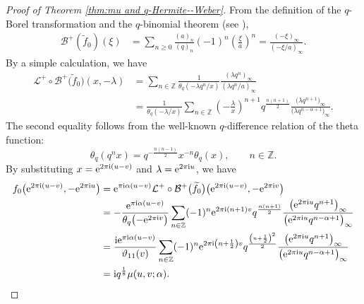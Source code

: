 \documentclass[pdftex]{sigma}
\numberwithin{equation}{section}
\theoremstyle{definition}
\newcommand{\Zz}{\mathbb{Z}}
\begin{document}
\begin{proof}[Proof of Theorem \ref{thm:mu and q-Hermite--Weber}]
From the definition of the $q$-Borel transformation and the $q$-binomial theorem (see \cite[p.~8, equation~(1.3.2)]{GR}),
\begin{align*}
\mathcal{B}^{+}\left(\widetilde{f}_{0}\right)(\xi )
 &=
 \sum_{n\geq 0}\frac{(a)_{n}}{(q)_{n}}(-1)^{n}\left(\frac{\xi }{a}\right)^{n}
 =
 \frac{(-\xi )_{\infty }}{(-\xi /a)_{\infty }}.
\end{align*}
By a simple calculation, we have
\begin{align*}
\mathcal{L}^{+}\circ\mathcal{B}^{+}\big(\widetilde{f}_{0}\big)(x,-\lambda)
 &=
 \sum_{n\in\Zz}\frac{1}{\theta_q(-\lambda q^n/x)}\frac{(\lambda q^n)_\infty}{(\lambda q^n/a)_\infty} \\
 &=
 \frac{1}{\theta_q(-\lambda/x)}\sum_{n\in\Zz}\left(-\frac{\lambda}{x}\right)^{n+1}q^\frac{n(n+1)}{2}
 \frac{\big(\lambda q^{n+1}\big)_{\infty }}{\big(\lambda q^{n-\alpha +1}\big)_{\infty }}.
\end{align*}
The second equality follows from the well-known $q$-difference relation of the theta function:
\[
\theta _{q}(q^{n}x)=q^{-\frac{n(n-1)}{2}}x^{-n}\theta _{q}(x), \qquad n \in \mathbb{Z}.
\]
By substituting $x={\rm e}^{2\pi{\rm i}(u-v)}$ and $\lambda={\rm e}^{2\pi{\rm i}u}$, we have
\begin{align*}
f_0\big({\rm e}^{2\pi{\rm i}(u-v)},-{\rm e}^{2\pi{\rm i}u}\big)
 &=
 {\rm e}^{\pi{\rm i}\alpha(u-v)}\mathcal{L}^{+}\circ\mathcal{B}^{+}\big(\widetilde{f}_{0}\big)\big({\rm e}^{2\pi{\rm i}(u-v)},-{\rm e}^{2\pi{\rm i}v}\big) \\
 &=
 -\frac{{\rm e}^{\pi{\rm i}\alpha(u-v)}}{\theta_q\big({-}{\rm e}^{2\pi{\rm i}v}\big)}\sum_{n\in\Zz}(-1)^n{\rm e}^{2\pi{\rm i}(n+1)v}q^\frac{n(n+1)}{2}\frac{\big({\rm e}^{2\pi{\rm i}u}q^{n+1}\big)_\infty}{\big({\rm e}^{2\pi{\rm i}u}q^{n-\alpha+1}\big)_\infty} \\
 &=
 \frac{{\rm i}{\rm e}^{\pi{\rm i}\alpha(u-v)}}{\vartheta_{11}(v)}\sum_{n\in\Zz}(-1)^n{\rm e}^{2\pi{\rm i}\left(n+\frac{1}{2}\right)v}q^\frac{\left(n+\frac{1}{2}\right)^2}{2}\frac{\big({\rm e}^{2\pi{\rm i}u}q^{n+1}\big)_\infty}{\big({\rm e}^{2\pi{\rm i}u}q^{n-\alpha+1}\big)_\infty} \\
 &=
 {\rm i}q^\frac{1}{8}\mu(u,v;\alpha).\tag*{\qed}
\end{align*}\renewcommand{\qed}{}
\end{proof}
\end{document}
